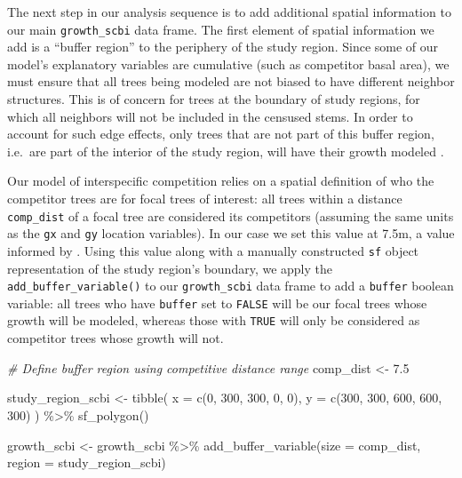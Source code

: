 \documentclass[12pt]{article}
\newenvironment{Shaded}{\begin{snugshade}}{\end{snugshade}}
\newcommand{\AttributeTok}[1]{\textcolor[rgb]{0.77,0.63,0.00}{#1}}
\newcommand{\CommentTok}[1]{\textcolor[rgb]{0.56,0.35,0.01}{\textit{#1}}}
\newcommand{\DecValTok}[1]{\textcolor[rgb]{0.00,0.00,0.81}{#1}}
\newcommand{\FloatTok}[1]{\textcolor[rgb]{0.00,0.00,0.81}{#1}}
\newcommand{\FunctionTok}[1]{\textcolor[rgb]{0.00,0.00,0.00}{#1}}
\newcommand{\NormalTok}[1]{#1}
\newcommand{\OtherTok}[1]{\textcolor[rgb]{0.56,0.35,0.01}{#1}}
\newcommand{\SpecialCharTok}[1]{\textcolor[rgb]{0.00,0.00,0.00}{#1}}
\begin{document}
The next step in our analysis sequence is to add additional spatial
information to our main \texttt{growth\_scbi} data frame. The first
element of spatial information we add is a ``buffer region'' to the
periphery of the study region. Since some of our model's explanatory
variables are cumulative (such as competitor basal area), we must ensure
that all trees being modeled are not biased to have different neighbor
structures. This is of concern for trees at the boundary of study
regions, for which all neighbors will not be included in the censused
stems. In order to account for such edge effects, only trees that are
not part of this buffer region, i.e.~are part of the interior of the
study region, will have their growth modeled
\citet{waller_applied_2004}.

Our model of interspecific competition relies on a spatial definition of
who the competitor trees are for focal trees of interest: all trees
within a distance \texttt{comp\_dist} of a focal tree are considered its
competitors (assuming the same units as the \texttt{gx} and \texttt{gy}
location variables). In our case we set this value at 7.5m, a value
informed by \citet{canham_neighborhood_2004}
\citet{uriarte_spatially_2004} \citet{canham_neighborhood_2006}. Using
this value along with a manually constructed \texttt{sf} object
representation of the study region's boundary, we apply the
\texttt{add\_buffer\_variable()} to our \texttt{growth\_scbi} data frame
to add a \texttt{buffer} boolean variable: all trees who have
\texttt{buffer} set to \texttt{FALSE} will be our focal trees whose
growth will be modeled, whereas those with \texttt{TRUE} will only be
considered as competitor trees whose growth will not.

\begin{Shaded}
\begin{Highlighting}[]
\CommentTok{\# Define buffer region using competitive distance range}
\NormalTok{comp\_dist }\OtherTok{\textless{}{-}} \FloatTok{7.5}

\NormalTok{study\_region\_scbi }\OtherTok{\textless{}{-}} \FunctionTok{tibble}\NormalTok{(}
  \AttributeTok{x =} \FunctionTok{c}\NormalTok{(}\DecValTok{0}\NormalTok{, }\DecValTok{300}\NormalTok{, }\DecValTok{300}\NormalTok{, }\DecValTok{0}\NormalTok{, }\DecValTok{0}\NormalTok{),}
  \AttributeTok{y =} \FunctionTok{c}\NormalTok{(}\DecValTok{300}\NormalTok{, }\DecValTok{300}\NormalTok{, }\DecValTok{600}\NormalTok{, }\DecValTok{600}\NormalTok{, }\DecValTok{300}\NormalTok{)}
\NormalTok{) }\SpecialCharTok{\%\textgreater{}\%}
  \FunctionTok{sf\_polygon}\NormalTok{()}

\NormalTok{growth\_scbi }\OtherTok{\textless{}{-}}\NormalTok{ growth\_scbi }\SpecialCharTok{\%\textgreater{}\%}
  \FunctionTok{add\_buffer\_variable}\NormalTok{(}\AttributeTok{size =}\NormalTok{ comp\_dist, }\AttributeTok{region =}\NormalTok{ study\_region\_scbi)}
\end{Highlighting}
\end{Shaded}
\end{document}
